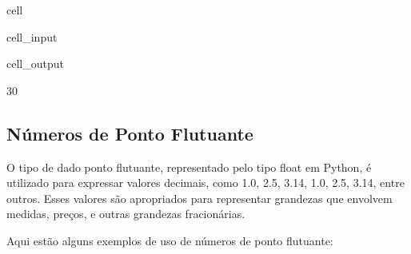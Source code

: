 \documentclass[letterpaper,10pt,english]{jupyterBook}
\begin{document}
\begin{sphinxuseclass}{cell}\begin{sphinxVerbatimInput}

\begin{sphinxuseclass}{cell_input}
\begin{sphinxVerbatim}[commandchars=\\\{\}]
  

  

  
\end{sphinxVerbatim}

\end{sphinxuseclass}\end{sphinxVerbatimInput}
\begin{sphinxVerbatimOutput}

\begin{sphinxuseclass}{cell_output}
\begin{sphinxVerbatim}[commandchars=\\\{\}]
30
\end{sphinxVerbatim}

\end{sphinxuseclass}\end{sphinxVerbatimOutput}

\end{sphinxuseclass}

\subsection{Números de Ponto Flutuante}
\label{\detokenize{chapters/ch2/ch2:numeros-de-ponto-flutuante}}
\sphinxAtStartPar
O tipo de dado ponto flutuante, representado pelo tipo float em Python, é utilizado para expressar valores decimais, como 1.0, 2.5, 3.14, \sphinxhyphen{}1.0, \sphinxhyphen{}2.5, \sphinxhyphen{}3.14, entre outros. Esses valores são apropriados para representar grandezas que envolvem medidas, preços, e outras grandezas fracionárias.

\sphinxAtStartPar
Aqui estão alguns exemplos de uso de números de ponto flutuante:
\end{document}

